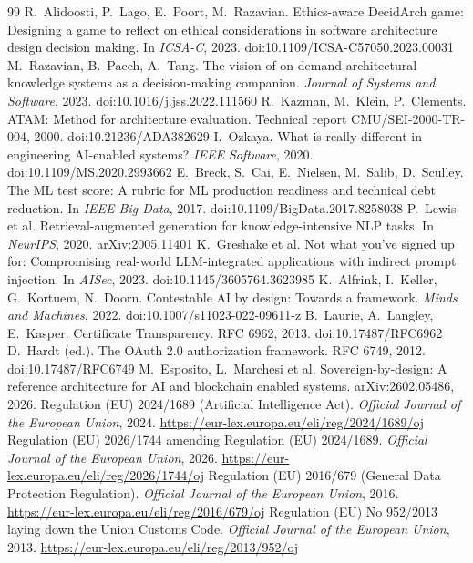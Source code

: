 \documentclass[10pt,twocolumn]{article}
\begin{document}
\begin{thebibliography}{99}
 R.~Alidoosti, P.~Lago, E.~Poort, M.~Razavian. Ethics-aware DecidArch game: Designing a game to reflect on ethical considerations in software architecture design decision making. In \emph{ICSA-C}, 2023. doi:10.1109/ICSA-C57050.2023.00031
 M.~Razavian, B.~Paech, A.~Tang. The vision of on-demand architectural knowledge systems as a decision-making companion. \emph{Journal of Systems and Software}, 2023. doi:10.1016/j.jss.2022.111560
 R.~Kazman, M.~Klein, P.~Clements. ATAM: Method for architecture evaluation. Technical report CMU/SEI-2000-TR-004, 2000. doi:10.21236/ADA382629
 I.~Ozkaya. What is really different in engineering AI-enabled systems? \emph{IEEE Software}, 2020. doi:10.1109/MS.2020.2993662
 E.~Breck, S.~Cai, E.~Nielsen, M.~Salib, D.~Sculley. The ML test score: A rubric for ML production readiness and technical debt reduction. In \emph{IEEE Big Data}, 2017. doi:10.1109/BigData.2017.8258038
 P.~Lewis et al. Retrieval-augmented generation for knowledge-intensive NLP tasks. In \emph{NeurIPS}, 2020. arXiv:2005.11401
 K.~Greshake et al. Not what you've signed up for: Compromising real-world LLM-integrated applications with indirect prompt injection. In \emph{AISec}, 2023. doi:10.1145/3605764.3623985
 K.~Alfrink, I.~Keller, G.~Kortuem, N.~Doorn. Contestable AI by design: Towards a framework. \emph{Minds and Machines}, 2022. doi:10.1007/s11023-022-09611-z
 B.~Laurie, A.~Langley, E.~Kasper. Certificate Transparency. RFC 6962, 2013. doi:10.17487/RFC6962
 D.~Hardt (ed.). The OAuth 2.0 authorization framework. RFC 6749, 2012. doi:10.17487/RFC6749
 M.~Esposito, L.~Marchesi et al. Sovereign-by-design: A reference architecture for AI and blockchain enabled systems. arXiv:2602.05486, 2026.
 Regulation (EU) 2024/1689 (Artificial Intelligence Act). \emph{Official Journal of the European Union}, 2024. \url{https://eur-lex.europa.eu/eli/reg/2024/1689/oj}
 Regulation (EU) 2026/1744 amending Regulation (EU) 2024/1689. \emph{Official Journal of the European Union}, 2026. \url{https://eur-lex.europa.eu/eli/reg/2026/1744/oj}
 Regulation (EU) 2016/679 (General Data Protection Regulation). \emph{Official Journal of the European Union}, 2016. \url{https://eur-lex.europa.eu/eli/reg/2016/679/oj}
 Regulation (EU) No 952/2013 laying down the Union Customs Code. \emph{Official Journal of the European Union}, 2013. \url{https://eur-lex.europa.eu/eli/reg/2013/952/oj}

\end{thebibliography}
\end{document}
